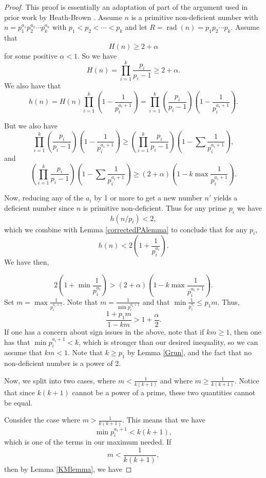\documentclass[12pt,reqno]{article}
\theoremstyle{plain}
\theoremstyle{definition}
\theoremstyle{remark}
\DeclareMathOperator{\rad}{rad}
\begin{document}
\begin{proof} This proof is essentially an adaptation of part of the argument used in prior work by Heath-Brown \cite{Heath-Brown}. Assume $n$ is a primitive non-deficient number with $n=p_1^{a_1}p_2^{a_2} \cdots p_k^{a_k}$ with $p_1 < p_2 < \cdots < p_k$ and let $R=\rad(n) = p_1p_2\cdots p_k$. Assume  that $$H(n) \geq 2 + \alpha$$ for some positive $\alpha <1$. So we have $$H(n) = \prod_{i=1}^k \frac{p_i}{p_i -1}   \geq 2 + \alpha .$$  We also have that
 $$h(n) = H(n) \prod_{i=1}^k \left(1 - \frac{1}{p_i^{a_i+1}}\right) = \prod_{i=1}^k \left(\frac{p_i}{p_i-1}\right)\left(1 - \frac{1}{p_i^{a_i+1}}\right).$$
 
 
But we also have $$\prod_{i=1}^k \left(\frac{p_i}{p_i-1}\right)\left(1 - \frac{1}{p_i^{a_i+1}}\right) \geq \left(\prod_{i=1}^k \frac{p_i}{p_i-1}\right)\left(1 - \sum \frac{1}{p_i^{a_i+1}}\right),$$
and $$ \left(\prod_{i=1}^k \frac{p_i}{p_i-1}\right)\left(1 - \sum \frac{1}{p_i^{a_i+1}}\right) \geq \left(2+ \alpha \right)\left(1 - k \max  \frac{1}{p_i^{a_i+1}}\right).$$

Now, reducing any of the $a_i$ by 1 or more to get a new number $n'$ yields a deficient number since $n$ is primitive non-deficient. Thus for any prime $p_i$ we have $$h(n/p_i) < 2,$$ which we combine with   Lemma \ref{correctedPAlemma}  to conclude that for any $p_i$, 
$$h(n) < 2\left(1 + \frac{1}{p_i^{a_i}}\right). $$
We have then,

$$2\left(1 + \min \frac{1}{p_i^{a_i}} \right)> (2+\alpha )\left(1 - k \max  \frac{1}{p_i^{a_i+1}}\right). $$
Set $m= \max \frac{1}{p_i^{a_i+1}}$. Note that $m = \frac{1}{\min p_i^{a_i +1}}$ and that 
$\min \frac{1}{p_i^{a_i}} \leq p_1 m$. Thus, 
$$\frac{1+p_1m}{1-km} > 1+\frac{\alpha}{2}. $$
If one has a concern about sign issues in the above, note that if $km  \geq 1$, then one has that $\min p_i^{a_i+1} < k$, which is stronger than our desired inequality, so we can assume that $km  < 1$. Note that $k \geq p_1$ by Lemma \ref{Grun}, and the fact that no non-deficient number is a power of 2. 

Now, we split into two cases, where $m < \frac{1}{k(k+1)}$ and where $m \geq \frac{1}{k(k+1)}$. Notice that since $k(k+1)$ cannot be a power of a prime, these two quantities cannot be equal.

Consider the case where $m > \frac{1}{k(k+1)}$. This means that we have $$\min p_i^{a_i+1} < k(k+1),$$ which is one of the terms in our maximum needed.  If $$m < \frac{1}{k(k+1)},$$ then by Lemma \ref{KMlemma}, we have 


\end{proof}
\end{document}
